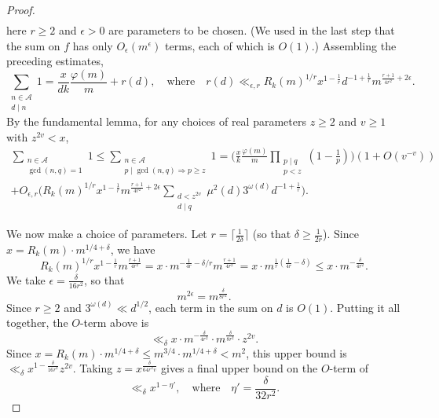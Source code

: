 \documentclass{scrartcl}
\theoremstyle{plain}
\theoremstyle{remark}
\renewcommand{\phi}{\varphi}
\newcommand{\1}{\mathbf{1}}
\newcommand{\sA}{\mathcal{A}}
\begin{document}
\begin{proof}
\begin{align*}
\end{align*}
here $r \ge 2$ and $\epsilon > 0$ are parameters to be chosen. (We used in the last step that the sum on $f$ has only $O_{\epsilon}(m^{\epsilon})$ terms, each of which is $O(1)$.) Assembling the preceding estimates,
\[ \sum_{\substack{n \in \sA \\ d \mid n}} 1 = \frac{x}{dk}\frac{\phi(m)}{m} + r(d),
\quad\text{where}\quad r(d) \ll_{\epsilon,r} R_k(m)^{1/r} x^{1-\frac1r} d^{-1+\frac{1}{r}} m^{\frac{r+1}{4r^2}+2\epsilon}. \]
By the fundamental lemma, for any choices of real parameters $z\ge 2$ and $v\ge 1$ with $z^{2v} < x$,
\begin{multline*} \sum_{\substack{n \in \sA\\\gcd(n,q)=1}} 1 \le \sum_{\substack{n \in \sA \\ p \mid \gcd(n,q) \Rightarrow p \ge z}} 1 = \Bigg(\frac{x}{k}\frac{\phi(m)}{m} \prod_{\substack{p \mid q \\ p< z}}\left(1-\frac{1}{p}\right)\Bigg)\left(1 + O(v^{-v})\right) \\ + O_{\epsilon,r}\Bigg(R_k(m)^{1/r} x^{1-\frac1r} m^{\frac{r+1}{4r^2}+2\epsilon} \sum_{\substack{d < z^{2v} \\ d\mid q}} \mu^2(d) 3^{\omega(d)} d^{-1+\frac1r}\Bigg).\end{multline*}

We now make a choice of parameters. Let $r = \lceil \frac{1}{2\delta}\rceil$ (so that $\delta \ge \frac{1}{2r}$). Since $x=R_k(m)\cdot m^{1/4+\delta}$, we have
\[ R_k(m)^{1/r} x^{1-\frac1r} m^{\frac{r+1}{4r^2}} = x \cdot m^{-\frac{1}{4r} -\delta/r} m^{\frac{r+1}{4r^2}} = x \cdot m^{\frac{1}{r}(\frac{1}{4r}-\delta)} \le x\cdot m^{-\frac{\delta}{4r^2}}. \]
We take $\epsilon = \frac{\delta}{16r^2}$, so that
\[ m^{2\epsilon} = m^{\frac{\delta}{8r^2}}. \]
Since $r\ge 2$ and $3^{\omega(d)} \ll d^{1/2}$, each term in the sum on $d$ is $O(1)$. Putting it all together, the $O$-term above is
\[ \ll_{\delta} x \cdot m^{-\frac{\delta}{4r^2}} \cdot  m^{\frac{\delta}{8r^2}} \cdot z^{2v}. \]
Since $x = R_k(m) \cdot m^{1/4+\delta} \le m^{3/4} \cdot m^{1/4+\delta} < m^2$, this upper bound is $\ll_{\delta} x^{1-\frac{\delta}{16r^2}} z^{2v}$. Taking $z = x^{\frac{\delta}{64r^2 v}}$ gives a final upper bound on the $O$-term of
\[ \ll_{\delta} x^{1-\eta'},\quad\text{where}\quad \eta' = \frac{\delta}{32r^2}. \]


\end{proof}
\end{document}
